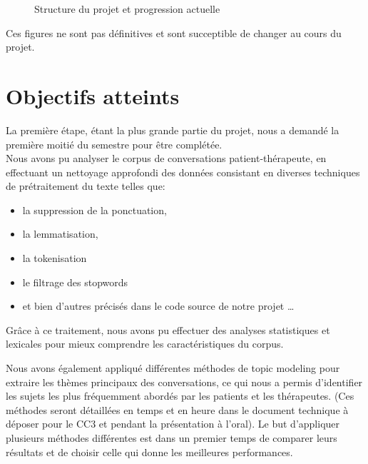 \documentclass[12pt,a4paper]{article}
\begin{document}
\begin{figure}[H]
\begin{center}
\caption{\centering\small Structure du projet et progression actuelle}
\end{center}
\end{figure}
Ces figures ne sont pas définitives et sont succeptible de changer au cours du projet.

\pagebreak
\section{Objectifs atteints}

\hspace*{1cm}La première étape, étant la plus grande partie du projet, nous a demandé la première moitié du semestre pour être complétée.\\
Nous avons pu analyser le corpus de conversations patient-thérapeute, en effectuant un nettoyage approfondi des données consistant en 
diverses techniques de prétraitement du texte telles que: 
\begin{itemize}
    \item la suppression de la ponctuation, 
    \item la lemmatisation, 
    \item la tokenisation 
    \item le filtrage des stopwords
    \item et bien d'autres précisés dans le code source de notre projet \dots
\end{itemize}
Grâce à ce traitement, nous avons pu effectuer des analyses statistiques et 
lexicales pour mieux comprendre les caractéristiques du corpus.\smallbreak

Nous avons également appliqué différentes méthodes de topic modeling pour extraire les thèmes principaux des conversations,
ce qui nous a permis d'identifier les sujets les plus fréquemment abordés par les patients et les thérapeutes. 
(Ces méthodes seront détaillées en temps et en heure dans le document technique à déposer pour le CC3 et pendant la présentation à l'oral).
Le but d'appliquer plusieurs méthodes différentes est dans un premier temps de comparer leurs résultats et de choisir celle qui donne les meilleures performances.\smallbreak
\end{document}
